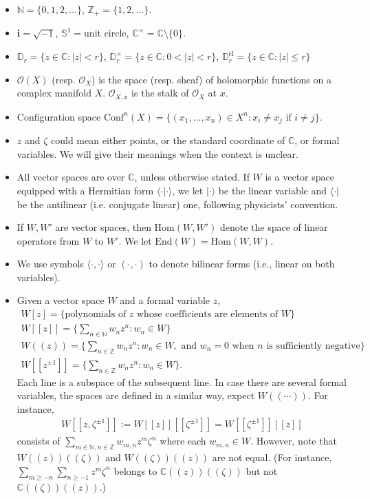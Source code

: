 \documentclass[11pt,b5paper,notitlepage]{article}
\theoremstyle{definition}
\theoremstyle{plain}
\newcommand{\End}{\mathrm{End}} %
\newcommand{\Hom}{\mathrm{Hom}}
\newcommand{\Conf}{\mathrm{Conf}}
\newcommand{\bk}[1]{\langle {#1}\rangle}
\newcommand{\scr}{\mathscr}
\newcommand{\im}{\mathbf{i}}
\newcommand{\mbb}{\mathbb}
\newcommand{\Cbb}{\mathbb C}
\newcommand{\Nbb}{\mathbb N}
\newcommand{\Zbb}{\mathbb Z}
\newcommand{\Dbb}{\mathbb D}
\newcommand{\Sbb}{{\mathbb S}}
\newcommand{\cl}{\mathrm{cl}}
\numberwithin{equation}{section}
\begin{document}
\begin{itemize}
\item $\Nbb=\{0,1,2,\dots\}$, $\Zbb_+=\{1,2,\dots\}$. 
\item $\im=\sqrt{-1}$, $\Sbb^1=$unit circle, $\Cbb^\times=\Cbb\setminus\{0\}$.
\item $\mbb D_r=\{z\in\Cbb:|z|<r\}$, $\mbb D_r^\times=\{z\in\Cbb:0<|z|<r\}$, $\Dbb_r^\cl=\{z\in\Cbb:|z|\leq r\}$
\item $\scr O(X)$ (resp. $\scr O_X$) is the space (resp. sheaf) of holomorphic functions on a complex manifold $X$. $\scr O_{X,x}$ is the stalk of $\scr O_X$ at $x$.
\item Configuration space $\Conf^n(X)=\{(x_1,\dots,x_n)\in X^n:x_i\neq x_j\text{ if }i\neq j\}$.
\item $z$ and $\zeta$ could mean either points, or the standard coordinate of $\Cbb$, or formal variables. We will give their meanings when the context is unclear. 
\item All vector spaces are over $\Cbb$, unless otherwise stated. If $W$ is a vector space equipped with a Hermitian form $\bk{\cdot|\cdot}$, we let $|\cdot\rangle$ be the linear variable and $\langle\cdot|$ be the antilinear (i.e. conjugate linear) one, following physicists' convention. 
\item If $W,W'$ are vector spaces, then $\Hom(W,W')$ denote the space of linear operators from $W$ to $W'$. We let $\End(W)=\Hom(W,W)$. 
\item We use symbols $\bk{\cdot,\cdot}$ or $(\cdot,\cdot)$ to denote bilinear forms (i.e., linear on both variables).
\item Given a vector space $W$ and a formal variable $z$,
\begin{subequations}
\begin{gather*}
W[z]=\{\text{polynomials of $z$ whose coefficients are elements of $W$}\}\\
W[[z]]=\Big\{\sum_{n\in\Nbb}w_nz^n:w_n\in W\Big\}\\
W((z))=\Big\{\sum_{n\in\Zbb}w_nz^n:w_n\in W,\text{ and }w_n=0\text{ when $n$ is sufficiently negative}\Big\}\\
W[[z^{\pm1}]]=\Big\{\sum_{n\in\Zbb}w_nz^n:w_n\in W\Big\}.
\end{gather*}
\end{subequations}
Each line is a subspace of the subsequent line. In case there are several formal variables, the spaces are defined in a similar way, expect $W((\cdots))$. For instance,
\begin{gather*}
W[[z,\zeta^{\pm1}]]:=W[[z]][[\zeta^{\pm1}]]=W[[\zeta^{\pm1}]][[z]]
\end{gather*}
consists of $\sum_{m\in\Nbb,n\in\Zbb}w_{m,n}z^m\zeta^n$ where each $w_{m,n}\in W$. However, note that $W((z))((\zeta))$ and $W((\zeta))((z))$ are not equal. (For instance, $\sum_{m\geq -n}\sum_{n\geq -1}z^m\zeta^n$ belongs to $\Cbb((z))((\zeta))$ but not $\Cbb((\zeta))((z))$.)


\end{itemize}
\end{document}
